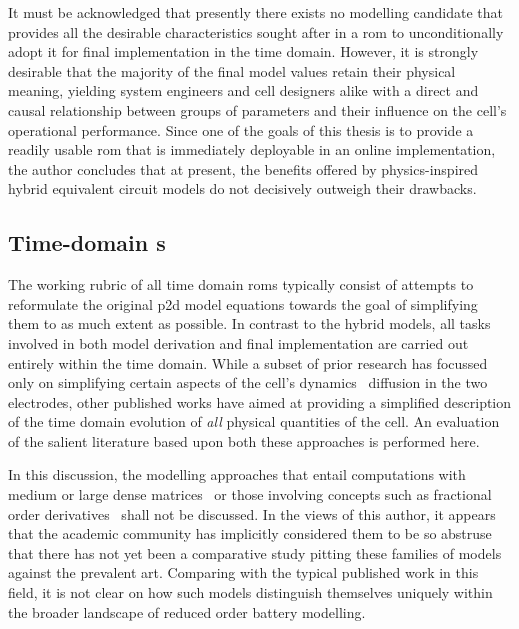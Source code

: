 It must be acknowledged that presently  there exists no modelling candidate that
provides  all the  desirable  characteristics  sought after  in  a \gls{rom}  to
unconditionally adopt it  for final implementation in the  time domain. However,
it is  strongly desirable  that the  majority of the  final model  values retain
their physical meaning, yielding system  engineers and cell designers alike with
a  direct  and  causal  relationship  between groups  of  parameters  and  their
influence on the cell's operational performance.  Since one of the goals of this
thesis is to  provide a readily usable \gls{rom} that  is immediately deployable
in an online implementation, the author  concludes that at present, the benefits
offered by physics-inspired  hybrid equivalent circuit models  do not decisively
outweigh their drawbacks.



\subsection{Time-domain  s}

The working rubric of all time  domain \glspl{rom} typically consist of attempts
to  reformulate the  original  \gls{p2d}  model equations  towards  the goal  of
simplifying  them to  as much  extent  as possible.  In contrast  to the  hybrid
models, all tasks involved in both model derivation and final implementation are
carried out  entirely within the time  domain. While a subset  of prior research
has  focussed  only  on  simplifying  certain aspects  of  the  cell's  dynamics
\eg~diffusion  in  the two  electrodes,  other  published  works have  aimed  at
providing a  simplified description of  the time domain evolution  of \emph{all}
physical quantities of  the cell. An evaluation of the  salient literature based
upon both these approaches is performed here.


In  this discussion,  the  modelling approaches  that  entail computations  with
medium or large dense matrices~\cite{Li2016,Xu2016,Corno2015} or those involving
concepts such  as fractional  order derivatives~\cite{Sabatier2014,Sabatier2015,
Li2017, Mu2017, Wang2017}  shall not be discussed. In the  views of this author,
it appears that  the academic community has implicitly considered  them to be so
abstruse that there has not yet  been a comparative study pitting these families
of models against  the prevalent art. Comparing with the  typical published work
in  this field,  it  is not  clear  on how  such  models distinguish  themselves
uniquely within the broader landscape of reduced order battery modelling.


